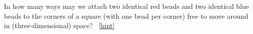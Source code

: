 \documentclass{book}
\begin{document}
\setcounter{project}{113}
\addtocounter{project}{-1}
\begin{activity}[]\label{twocolorsofbeads}
\hypertarget{p-820}{}%
In how many ways may we attach two identical red beads and two identical blue beads to the corners of a square (with one bead per corner) free to move around in (three-dimensional) space?%
~\hfill{\tiny\hyperlink{a-113}{[hint]}\hypertarget{q-113}{}}\end{activity}
\end{document}
